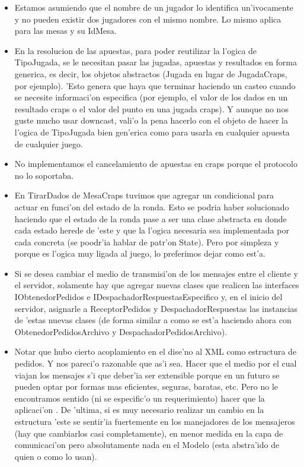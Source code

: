 \begin{itemize}
\item Estamos asumiendo que el nombre de un jugador lo identifica un'ivocamente y no pueden existir dos jugadores con el mismo nombre. Lo mismo aplica para las mesas y su IdMesa.

\item En la resolucion de las apuestas, para poder reutilizar la l'ogica de TipoJugada, se le necesitan pasar las jugadas, apuestas y resultados en forma generica, es decir, los objetos abstractos (Jugada en lugar de JugadaCraps, por ejemplo). 'Esto genera que haya que terminar haciendo un casteo cuando se necesite informaci'on especifica (por ejemplo, el valor de los dados en un resultado craps o el valor del punto en una jugada craps). Y aunque no nos guste mucho usar downcast, vali'o la pena hacerlo con el objeto de hacer la l'ogica de TipoJugada bien gen'erica como para usarla en cualquier apuesta de cualquier juego.

\item No implementamos el cancelamiento de apuestas en craps porque el protocolo no lo soportaba.

\item En TirarDados de MesaCraps tuvimos que agregar un condicional para actuar en funci'on del estado de la ronda. Esto se podria haber solucionado haciendo que el estado de la ronda pase a ser una clase abstracta en donde cada estado herede de 'este y que la l'ogica necesaria sea implementada por cada concreta (se poodr'ia hablar de patr'on State). Pero por simpleza y porque es l'ogica muy ligada al juego, lo preferimos dejar como est'a.

\item Si se desea cambiar el medio de transmisi'on de los mensajes entre el cliente y el servidor, solamente hay que agregar nuevas clases que realicen las interfaces IObtenedorPedidos e IDespachadorRespuestasEspecifico y, en el inicio del servidor, asignarle a ReceptorPedidos y DespachadorRespuestas las instancias de 'estas nuevas clases (de forma similar a como se est'a haciendo ahora con ObtenedorPedidosArchivo y DespachadorPedidosArchivo).

\item Notar que hubo cierto acoplamiento en el dise'no al XML como estructura de pedidos. Y nos pareci'o razonable que as'i sea. Hacer que el medio por el cual viajan los mensajes s'i que deber'ia ser extensible porque en un futuro se pueden optar por formas mas eficientes, seguras, baratas, etc. Pero no le encontramos sentido (ni se especific'o un requerimiento) hacer que la aplicaci'on . De 'ultima, si es muy necesario realizar un cambio en la estructura 'este se sentir'ia fuertemente en los manejadores de los mensajeros (hay que cambiarlos casi completamente), en menor medida en la capa de comunicaci'on pero absolutamente nada en el Modelo (esta abstra'ido de quien o como lo usan).

\end{itemize}
